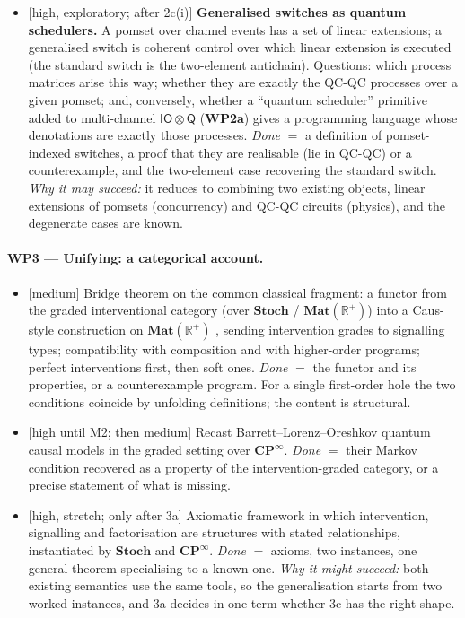 \documentclass[11pt,a4paper]{article}
\newif\ifskeletonnotes
\newcommand{\sknote}[1]{\ifskeletonnotes{\small\color{blue!60!black}\textit{[#1]}}\fi}
\newcommand{\risk}[1]{\textsf{\small[#1]}}
\newcommand{\WP}[1]{\textbf{WP#1}}
\newcommand{\iotq}{\mathsf{IO}\otimes\mathsf{Q}}   %
\newcommand{\CPinf}{\mathbf{CP}^{\infty}}
\begin{document}
\begin{itemize}[nosep]
\item[2d] \risk{high, exploratory; after 2c(i)} \textbf{Generalised switches as quantum schedulers.} A pomset over channel events has a set of linear extensions; a generalised switch is coherent control over which linear extension is executed (the standard switch is the two-element antichain). Questions: which process matrices arise this way; whether they are exactly the QC-QC processes over a given pomset; and, conversely, whether a ``quantum scheduler'' primitive added to multi-channel $\iotq$ (\WP{2a}) gives a programming language whose denotations are exactly those processes. \emph{Done} $=$ a definition of pomset-indexed switches, a proof that they are realisable (lie in QC-QC) or a counterexample, and the two-element case recovering the standard switch. \emph{Why it may succeed:} it reduces to combining two existing objects, linear extensions of pomsets (concurrency) and QC-QC circuits (physics), and the degenerate cases are known.
\end{itemize}
\paragraph{\WP{3} --- Unifying: a categorical account.}
\begin{itemize}[nosep]
\item[3a] \risk{medium} Bridge theorem on the common classical fragment: a functor from the graded interventional category (over $\mathbf{Stoch}$ / $\mathbf{Mat}(\mathbb{R}^+)$) into a Caus-style construction on $\mathbf{Mat}(\mathbb{R}^+)$ \sknote{check Caus paper: $\mathbf{Mat}(\mathbb{R}^+)$ precausal}, sending intervention grades to signalling types; compatibility with composition and with higher-order programs; perfect interventions first, then soft ones. \emph{Done} $=$ the functor and its properties, or a counterexample program. For a single first-order hole the two conditions coincide by unfolding definitions; the content is structural.
\item[3b] \risk{high until M2; then medium} Recast Barrett--Lorenz--Oreshkov quantum causal models in the graded setting over $\CPinf$. \emph{Done} $=$ their Markov condition recovered as a property of the intervention-graded category, or a precise statement of what is missing.
\item[3c] \risk{high, stretch; only after 3a} Axiomatic framework in which intervention, signalling and factorisation are structures with stated relationships, instantiated by $\mathbf{Stoch}$ and $\CPinf$. \emph{Done} $=$ axioms, two instances, one general theorem specialising to a known one. \emph{Why it might succeed:} both existing semantics use the same tools, so the generalisation starts from two worked instances, and 3a decides in one term whether 3c has the right shape.
\end{itemize}
\end{document}
